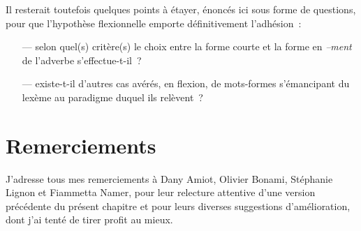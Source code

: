 \documentclass[output=paper]{langsci/langscibook}
\begin{document}
Il resterait toutefois quelques points à étayer, énoncés ici sous forme de questions, pour que l'hypothèse flexionnelle emporte définitivement l'adhésion~:
\begin{itemize}
\item[---] selon quel(s) critère(s) le choix entre la forme courte et la forme en \emph{--ment} de l'adverbe s'effectue-t-il~?

\item[---] existe-t-il d'autres cas avérés, en flexion, de mots-formes s'émancipant du lexème au paradigme duquel ils relèvent~?
\end{itemize}
\section*{Remerciements}

J'adresse tous mes remerciements à Dany Amiot, Olivier Bonami, Stéphanie Lignon et Fiammetta Namer, pour leur relecture attentive d'une version précédente du présent chapitre et pour leurs diverses suggestions d'amélioration, dont j'ai tenté de tirer profit au mieux.
\end{document}
